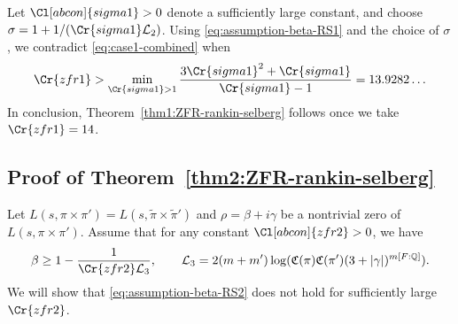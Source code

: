 \documentclass[12pt,reqno]{amsart}
\renewcommand{\tilde}{\widetilde}
\theoremstyle{remark}
\renewcommand{\tilde}{\widetilde}
\renewcommand{\tilde}{\widetilde}
\newcommand{\Q}{\mathbb{Q}}
\numberwithin{equation}{section}
\begin{document}
    Let $\Cl[abcon]{sigma1}>0$ denote a sufficiently large constant, and choose
    $\sigma = 1 + {1}/({\Cr{sigma1}\mathcal{L}_2})$.     %
    Using \eqref{eq:assumption-beta-RS1} and the choice of $\sigma$, we contradict \eqref{eq:case1-combined} when
    \[
    \Cr{zfr1} >  \min_{\Cr{sigma1} > 1} \frac{3\Cr{sigma1}^2+\Cr{sigma1}}{\Cr{sigma1}-1} =  13.9282\ldots
    \]
    In conclusion, Theorem~\ref{thm1:ZFR-rankin-selberg} follows once we take $\Cr{zfr1} = 14$.
	
	\subsection{Proof of Theorem~\ref{thm2:ZFR-rankin-selberg}}\label{subsec:thm3} 
	
	
	Let $L(s, \pi \times \pi') = L(s, \tilde{\pi} \times \tilde{\pi}')$ and %
    $\rho = \beta +i\gamma$ be a nontrivial zero of $L(s, \pi \times \pi')$. Assume that for any constant $\Cl[abcon]{zfr2} > 0$, we have
    \begin{equation}\label{eq:assumption-beta-RS2}
		\begin{aligned}
			\beta
			\ge 1- \frac{1}{\Cr{zfr2}\mathcal{L}_3}, \qquad \mathcal{L}_3 = 2(m+m')\log(\mathfrak{C}(\pi) \mathfrak{C}(\pi')(3+|\gamma|)^{m[F:\Q]}).
		\end{aligned}
	\end{equation}
	We will show that \eqref{eq:assumption-beta-RS2} does not hold for sufficiently large $\Cr{zfr2}$.
    
\end{document}
